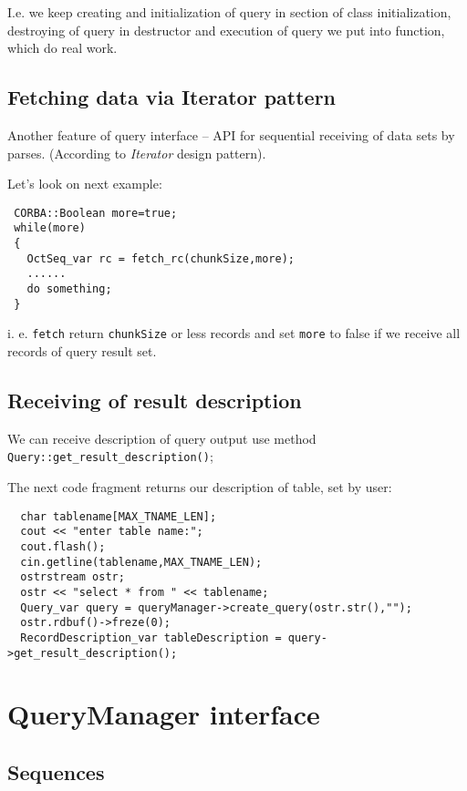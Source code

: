 \documentclass[10pt]{article}
\begin{document}
 I.e. we keep creating and initialization of query in section of
class initialization, destroying of query in destructor and execution
of query we put into function, which do real work.

\subsection { Fetching data via Iterator pattern }

 Another feature of query interface -- API for sequential receiving of
data sets by parses. (According to {\em Iterator} design pattern).

 Let's look on next example:

\begin{verbatim}
 CORBA::Boolean more=true;
 while(more)
 {
   OctSeq_var rc = fetch_rc(chunkSize,more);
   ......
   do something;
 }
\end{verbatim}

 i. e. \verb|fetch| return \verb|chunkSize| or less records and set 
 \verb|more| to false if we receive all records of query result set.

\subsection { Receiving of result description  }

 We can receive description of query output  use method
 \verb|Query::get_result_description()|;

 The next code fragment returns our description of table, set by user:

\begin{verbatim}
  char tablename[MAX_TNAME_LEN];
  cout << "enter table name:";
  cout.flash();
  cin.getline(tablename,MAX_TNAME_LEN); 
  ostrstream ostr;
  ostr << "select * from " << tablename;
  Query_var query = queryManager->create_query(ostr.str(),"");
  ostr.rdbuf()->freze(0);
  RecordDescription_var tableDescription = query->get_result_description(); 
\end{verbatim}


\section{ QueryManager interface }

 
\subsection { Sequences }
 
\end{document}
